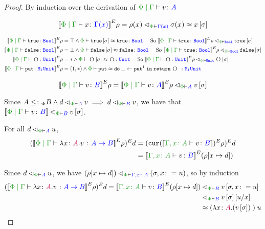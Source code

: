 \documentclass{Report}
\newcommand\eLogRel[4]{\logRel{#2}{\wellformed{#1}{#3}}{#4}}
\newcommand\peLogRel[3]{\eLogRel{\P}{#1}{#2}{#3}}
\newcommand{\zpberelation}[2]{\berelation{\P}{#1}{#2}}
\newcommand{\fapply}[0]{^E}
\begin{document}
\begin{proof}
    By induction over the derivation of $\gpetyperelation{v}{A}$

    \begin{equation}
        \deno{\gpetyperelation{x}{\G(x)}}\fapply\rho = \peLogRel{\rho(x)}{\G(x)}{\si(x)}\beequiv x\ssi
    \end{equation}

    \begin{align*}
        \deno{\gpetyperelation{\t}{\B}}\fapply\rho & = \top \wedge \zpberelation{\t\ssi}{\t}{\B} \qt{ So } \peLogRel{\deno{\gpetyperelation{\t}{\B}}\fapply\rho}{\B}{\t\ssi}\\
        \deno{\gpetyperelation{\f}{\B}}\fapply\rho & = \bot \wedge \zpberelation{\f\ssi}{\f}{\B} \qt{ So } \peLogRel{\deno{\gpetyperelation{\t}{\B}}\fapply\rho}{\B}{\f\ssi}\\
        \deno{\gpetyperelation{\u}{\U}}\fapply\rho & = \singleton \wedge \zpberelation{\u\ssi}{\u}{\U} \qt{ So } \peLogRel{\deno{\gpetyperelation{\u}{\U}}\fapply\rho}{\U}{\u\ssi}\\
        \deno{\gpetyperelation{\put}{\M{1}{\U}}}\fapply\rho & = (1, \singleton)\wedge \zpberelation{\put}{\doin{\_}{\put^1}{\return{\u}}}{\M{1}{\U}}\\ 
    \end{align*}



    \begin{equation}
        \deno{\gpetyperelation{v}{B}}\fapply\rho = \peLogRel{\deno{\gpetyperelation{v}{A}}\fapply\rho}{A}{v\ssi}
    \end{equation}

    Since $A\subtypep B \wedge \peLogRel{d}{A}{v} \implies \peLogRel{d}{B}{v}$, we have that $\peLogRel{\deno{\gpetyperelation{v}{B}}}{B}{v\ssi}$.


    For all $\peLogRel{d}{A}{u}$, 
    \begin{align*}
        (\deno{\gpetyperelation{\lam{x}{A}{v}}{\ab}}\fapply\rho)\fapply d & = (\cur{\deno{\typerelation{\gax}{v}{B}}}\fapply\rho)\fapply d\\
        & = \deno{\typerelation{\gax}{v}{B}}\fapply (\rho[x\mapsto d])\\
    \end{align*}

    Since $\peLogRel{d}{A}{u}$, we have $\peLogRel{(\rho[x\mapsto d])}{\gax}{(\si, x\setto u)}$, so by induction
    \begin{align*}
        (\deno{\gpetyperelation{\lam{x}{A}{v}}{\ab}}\fapply\rho)\fapply d = \peLogRel{\deno{\typerelation{\gax}{v}{B}}\fapply(\rho[x\mapsto d])&}{B}{v\sub{\si, x\setto u}}
        \\
        \peLogRel{&}{B}{v\ssi\ssub{x}{u}}\\
        & \beequiv \apply{(\lam{x}{A}{(v\ssi)})}{u}
    \end{align*}
\end{proof}
\end{document}
